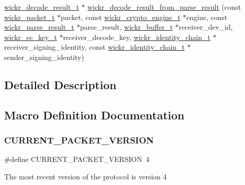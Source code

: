 \begin{DoxyCompactItemize}
\item 
\mbox{\hyperlink{structwickr__decode__result}{wickr\+\_\+decode\+\_\+result\+\_\+t}} $\ast$ \mbox{\hyperlink{group__wickr__protocol_ga32d9da2e10d1d653b2ac894d50aaedb0}{wickr\+\_\+decode\+\_\+result\+\_\+from\+\_\+parse\+\_\+result}} (const \mbox{\hyperlink{structwickr__packet}{wickr\+\_\+packet\+\_\+t}} $\ast$packet, const \mbox{\hyperlink{structwickr__crypto__engine}{wickr\+\_\+crypto\+\_\+engine\+\_\+t}} $\ast$engine, const \mbox{\hyperlink{structwickr__parse__result}{wickr\+\_\+parse\+\_\+result\+\_\+t}} $\ast$parse\+\_\+result, \mbox{\hyperlink{structwickr__buffer}{wickr\+\_\+buffer\+\_\+t}} $\ast$receiver\+\_\+dev\+\_\+id, \mbox{\hyperlink{structwickr__ec__key}{wickr\+\_\+ec\+\_\+key\+\_\+t}} $\ast$receiver\+\_\+decode\+\_\+key, \mbox{\hyperlink{structwickr__identity__chain}{wickr\+\_\+identity\+\_\+chain\+\_\+t}} $\ast$receiver\+\_\+signing\+\_\+identity, const \mbox{\hyperlink{structwickr__identity__chain}{wickr\+\_\+identity\+\_\+chain\+\_\+t}} $\ast$sender\+\_\+signing\+\_\+identity)
\end{DoxyCompactItemize}


\subsection{Detailed Description}


\subsection{Macro Definition Documentation}
\mbox{\label{group__wickr__protocol_ga89ff9f93c5494db53d3ff27353989862}} 
\subsubsection{\texorpdfstring{C\+U\+R\+R\+E\+N\+T\+\_\+\+P\+A\+C\+K\+E\+T\+\_\+\+V\+E\+R\+S\+I\+ON}{CURRENT\_PACKET\_VERSION}}
{\footnotesize\ttfamily \#define C\+U\+R\+R\+E\+N\+T\+\_\+\+P\+A\+C\+K\+E\+T\+\_\+\+V\+E\+R\+S\+I\+ON~4}

The most recent version of the protocol is version 4 \mbox{\label{group__wickr__protocol_gad269883d0b8b26c4fa52da595ef5ddf7}} 
